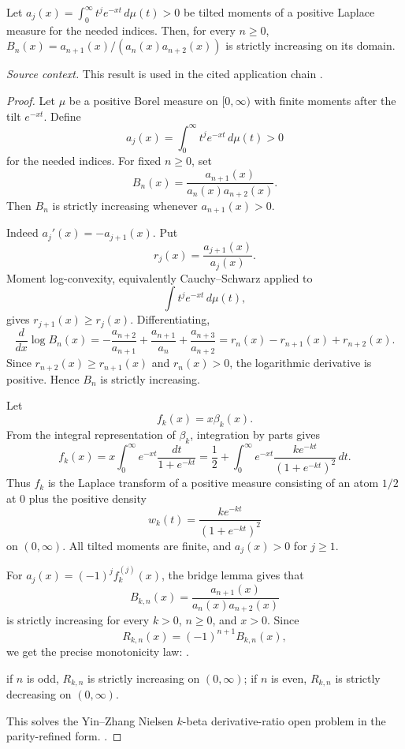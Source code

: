 \begin{proposition}
\label{res:cm-laplace-moment-ratio-monotonicity}
Let \(a_j(x)=\int_0^\infty t^j e^{-xt}\,d\mu(t)>0\) be tilted moments of a positive Laplace measure for the needed indices. Then, for every \(n\ge0\), \(B_n(x)=a_{n+1}(x)/(a_n(x)a_{n+2}(x))\) is strictly increasing on its domain.

\emph{Source context.} This result is used in the cited application chain \cite{yin-zhang-k-beta}.
\end{proposition}
\begin{proof}
Let \(\mu\) be a positive Borel measure on \([0,\infty)\) with finite moments after the tilt \(e^{-xt}\). Define
\[
a_j(x)=\int_0^\infty t^j e^{-xt}\,d\mu(t)>0
\]
for the needed indices. For fixed \(n\ge0\), set
\[
B_n(x)=\frac{a_{n+1}(x)}{a_n(x)a_{n+2}(x)}.
\]
Then \(B_n\) is strictly increasing whenever \(a_{n+1}(x)>0\).

Indeed \(a_j'(x)=-a_{j+1}(x)\). Put
\[
r_j(x)=\frac{a_{j+1}(x)}{a_j(x)}.
\]
Moment log-convexity, equivalently Cauchy--Schwarz applied to
\[
\int t^j e^{-xt}\,d\mu(t),
\]
gives \(r_{j+1}(x)\ge r_j(x)\). Differentiating,
\[
\frac{d}{dx}\log B_n(x)
=-\frac{a_{n+2}}{a_{n+1}}
+\frac{a_{n+1}}{a_n}
+\frac{a_{n+3}}{a_{n+2}}
=r_n(x)-r_{n+1}(x)+r_{n+2}(x).
\]
Since \(r_{n+2}(x)\ge r_{n+1}(x)\) and \(r_n(x)>0\), the logarithmic derivative is positive. Hence \(B_n\) is strictly increasing.

Let
\[
f_k(x)=x\beta_k(x).
\]
From the integral representation of \(\beta_k\), integration by parts gives
\[
f_k(x)
=x\int_0^\infty e^{-xt}\frac{dt}{1+e^{-kt}}
=\frac12+\int_0^\infty e^{-xt}\frac{k e^{-kt}}{(1+e^{-kt})^2}\,dt.
\]
Thus \(f_k\) is the Laplace transform of a positive measure consisting of an atom \(1/2\) at \(0\) plus the positive density
\[
w_k(t)=\frac{k e^{-kt}}{(1+e^{-kt})^2}
\]
on \((0,\infty)\). All tilted moments are finite, and \(a_{j}(x)>0\) for \(j\ge1\).

For \(a_j(x)=(-1)^j f_k^{(j)}(x)\), the bridge lemma gives that
\[
B_{k,n}(x)=\frac{a_{n+1}(x)}{a_n(x)a_{n+2}(x)}
\]
is strictly increasing for every \(k>0\), \(n\ge0\), and \(x>0\). Since
\[
R_{k,n}(x)=(-1)^{n+1}B_{k,n}(x),
\]
we get the precise monotonicity law: \cite{yin-zhang-k-beta}.

if \(n\) is odd, \(R_{k,n}\) is strictly increasing on \((0,\infty)\);
if \(n\) is even, \(R_{k,n}\) is strictly decreasing on \((0,\infty)\).

This solves the Yin--Zhang Nielsen \(k\)-beta derivative-ratio open problem in the parity-refined form. \cite{yin-zhang-k-beta}.
\end{proof}

